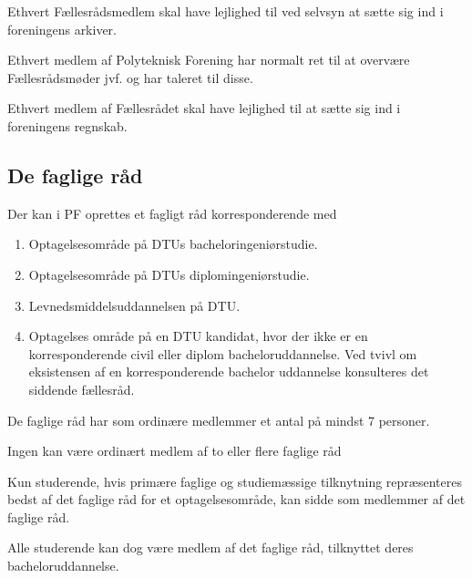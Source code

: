 \begin{list}
\item Ethvert Fællesrådsmedlem skal have lejlighed til ved selvsyn at sætte sig ind i foreningens arkiver.

\item Ethvert medlem af Polyteknisk Forening har normalt ret til at overvære Fællesrådsmøder jvf.  og har taleret til disse.

\item Ethvert medlem af Fællesrådet skal have lejlighed til at sætte sig ind i foreningens regnskab.



\subsection{De faglige råd}
\label{L:kap:Faglige}

\item \label{L4:hvem} Der kan i PF oprettes et fagligt råd korresponderende med
	\begin{enumerate}
	\item Optagelsesområde på DTUs bacheloringeniørstudie.
	\item Optagelsesområde på DTUs diplomingeniørstudie.
	\item Levnedsmiddelsuddannelsen på DTU.
	\item Optagelses område på en DTU kandidat, hvor der ikke er en korresponderende civil eller diplom bacheloruddannelse. Ved tvivl om eksistensen af en korresponderende bachelor uddannelse konsulteres det siddende fællesråd.
	\end{enumerate}     
    
\item \label{L4:ordinaere} De faglige råd har som ordinære medlemmer et antal på mindst 7 personer.

 Ingen kan være ordinært medlem af to eller flere faglige råd %

 Kun studerende, hvis primære faglige og studiemæssige tilknytning repræsenteres bedst af det faglige råd for et optagelsesområde, kan sidde som medlemmer af det faglige råd.
	
 Alle studerende kan dog være medlem af det faglige råd, tilknyttet deres bacheloruddannelse.


\end{list}
